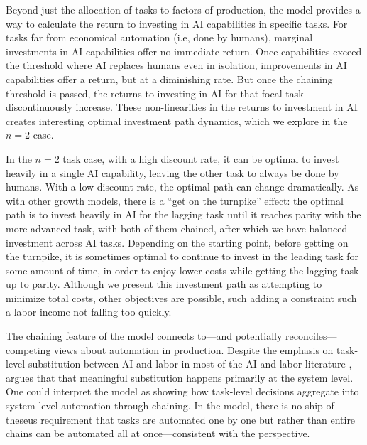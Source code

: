 \documentclass{article}
\theoremstyle{plain}
\theoremstyle{plain}
\begin{document}
Beyond just the allocation of tasks to factors of production, the model provides a way to calculate the return to investing in AI capabilities in specific tasks.
For tasks far from economical automation (i.e, done by humans), marginal investments in AI capabilities offer no immediate return.
Once capabilities exceed the threshold where AI replaces humans even in isolation, improvements in AI capabilities offer a return, but at a diminishing rate.
But once the chaining threshold is passed, the returns to investing in AI for that focal task discontinuously increase.
These non-linearities in the returns to investment in AI creates interesting optimal investment path dynamics, which we explore in the $n = 2$ case.

In the $n = 2$ task case, with a high discount rate, it can be optimal to invest heavily in a single AI capability, leaving the other task to always be done by humans.
With a low discount rate, the optimal path can change dramatically. 
As with other growth models, there is a ``get on the turnpike'' effect: the optimal path is to invest heavily in AI for the lagging task until it reaches parity with the more advanced task, with both of them chained, after which we have balanced investment across AI tasks.
Depending on the starting point, before getting on the turnpike, it is sometimes optimal to continue to invest in the leading task for some amount of time, in order to enjoy lower costs while getting the lagging task up to parity.
Although we present this investment path as attempting to minimize total costs, other objectives are possible, such adding a constraint such a labor income not falling too quickly.

The chaining feature of the model connects to---and potentially reconciles---competing views about automation in production. 
Despite the emphasis on task-level substitution between AI and labor in most of the AI and labor literature \citep{autor2003skill, acemoglu2018automation}, \cite{bresnahan2002information} argues that that meaningful substitution happens primarily at the system level. 
One could interpret the model as showing how task-level decisions aggregate into system-level automation through chaining.
In the model, there is no ship-of-theseus requirement that tasks are automated one by one but rather than entire chains can be automated all at once---consistent with the \cite{bresnahan2002information} perspective.
\end{document}
